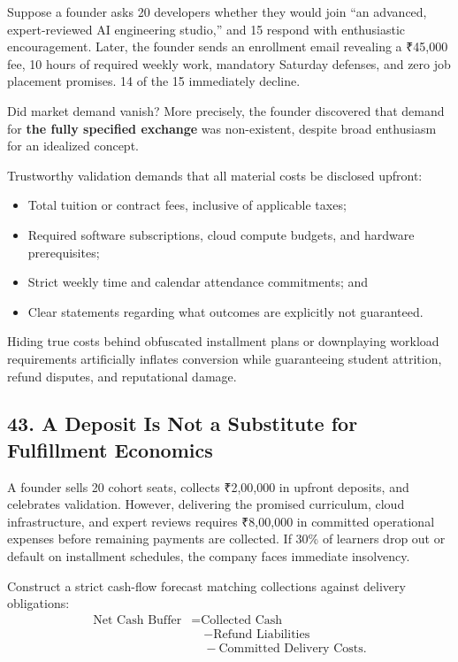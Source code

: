Suppose a founder asks 20 developers whether they would join ``an advanced, expert-reviewed AI engineering studio,'' and 15 respond with enthusiastic encouragement. Later, the founder sends an enrollment email revealing a ₹45,000 fee, 10 hours of required weekly work, mandatory Saturday defenses, and zero job placement promises. 14 of the 15 immediately decline.

Did market demand vanish? More precisely, the founder discovered that demand for \textbf{the fully specified exchange} was non-existent, despite broad enthusiasm for an idealized concept.

Trustworthy validation demands that all material costs be disclosed upfront:
\begin{itemize}
    \item Total tuition or contract fees, inclusive of applicable taxes;
    \item Required software subscriptions, cloud compute budgets, and hardware prerequisites;
    \item Strict weekly time and calendar attendance commitments; and
    \item Clear statements regarding what outcomes are explicitly not guaranteed.
\end{itemize}

Hiding true costs behind obfuscated installment plans or downplaying workload requirements artificially inflates conversion while guaranteeing student attrition, refund disputes, and reputational damage.

\subsection*{43. A Deposit Is Not a Substitute for Fulfillment Economics}

A founder sells 20 cohort seats, collects ₹2,00,000 in upfront deposits, and celebrates validation. However, delivering the promised curriculum, cloud infrastructure, and expert reviews requires ₹8,00,000 in committed operational expenses before remaining payments are collected. If 30\% of learners drop out or default on installment schedules, the company faces immediate insolvency.

Construct a strict cash-flow forecast matching collections against delivery obligations:
\begin{equation}
\begin{aligned}
\text{Net Cash Buffer} &= \text{Collected Cash} \\
&\quad - \text{Refund Liabilities} \\
&\quad - \text{Committed Delivery Costs}.
\end{aligned}
\end{equation}

